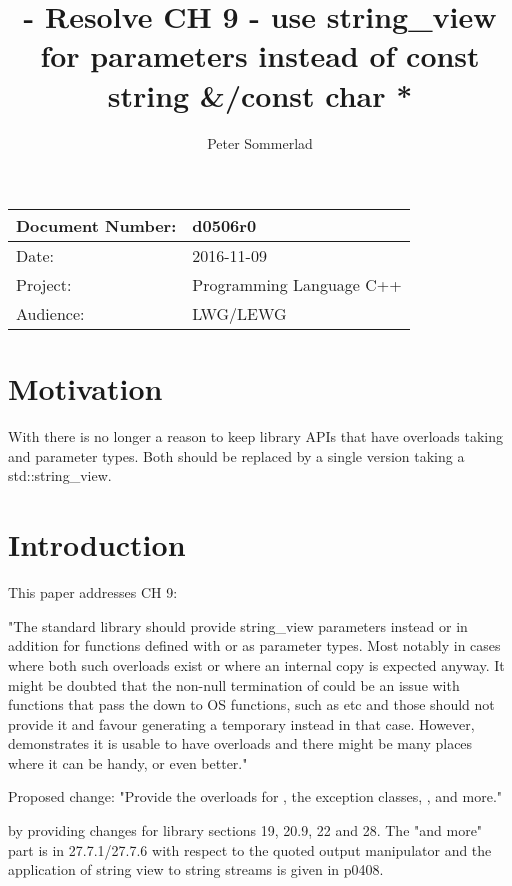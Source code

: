 \documentclass[ebook,11pt,article]{memoir}
\title{\papernumber{} - Resolve CH 9 - use string\_view for parameters instead of const string \&/const char *}
\author{Peter Sommerlad}
\date{\paperdate}                        %
\newcommand{\papernumber}{d0506r0}
\newcommand{\paperdate}{2016-11-09}
\begin{document}
\maketitle
\begin{tabular}[t]{|l|l|}\hline 
Document Number:& \papernumber  \\\hline
Date: & \paperdate \\\hline
Project: & Programming Language C++\\\hline 
Audience: & LWG/LEWG\\\hline
\end{tabular}

\chapter{Motivation}
With  there is no longer a reason to keep library APIs that have overloads taking  and  parameter types. Both should be replaced by a single version taking a std::string_view.

\chapter{Introduction}

This paper addresses CH 9:

"The standard library should provide string_view parameters instead or in addition for functions defined with  or  as parameter types. Most notably in cases where both such overloads exist or where an internal copy is expected anyway.
It might be doubted that the non-null termination of  could be an issue with functions that pass the  down to OS functions, such as  etc and those should not provide it and favour generating a  temporary instead in that case. However,  demonstrates it is usable to have  overloads and there might be many places where it can be handy, or even better."

Proposed change: "Provide the overloads for , the exception classes, ,  and more."

by providing changes for library sections 19, 20.9, 22 and 28. The "and more" part is in 27.7.1/27.7.6 with respect to the quoted output manipulator and the application of string view to string streams is given in p0408.
\end{document}
